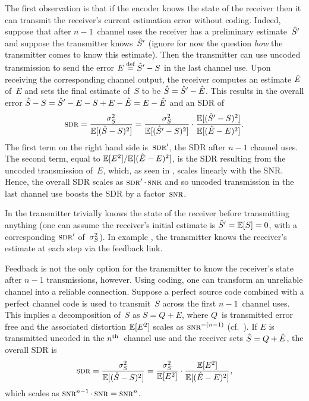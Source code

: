 The first observation is that if the encoder knows the state of the receiver
then it can transmit the receiver's current estimation error without coding. 
Indeed, suppose that after $n-1$~channel uses the receiver has a preliminary
estimate~${\hat{S}}'$ and suppose the transmitter knows~${\hat{S}}'$ (ignore for now the
question \emph{how} the transmitter comes to know this estimate). Then the
transmitter can use uncoded transmission to send the error $E \stackrel{\text{def}}{=} {\hat{S}}' - S$ in
the last channel use. Upon receiving the corresponding channel output, the
receiver computes an estimate $\hat{E}$ of~$E$ and sets the final estimate of~$S$ to
be ${\hat{S}} = {\hat{S}}' - \hat{E}$. This results in the overall error ${\hat{S}} - S = {\hat{S}}' - E - S
+ E - \hat{E} = E - \hat{E}$ and an SDR of
\begin{equation*}
  \sdr = \frac{\ssq}{\mse} = \frac{\ssq}{\E[(\Sh' - S)^2]} \cdot
  \frac{\E[(\Sh' - S)^2]}{\msee}.
\end{equation*}
The first term on the right hand side is~$\sdr'$, the SDR after $n-1$ channel
uses. The second term, equal to $\mathbb{E}[E^2]/{\mathbb{E}[(\hat{E} - E)^2]}$, is the SDR resulting from the
uncoded transmission of~$E$, which, as seen in , scales
linearly with the SNR. Hence, the overall SDR scales as $\sdr' \cdot \snr$ and
so uncoded transmission in the last channel use boosts the SDR by a
factor~$\snr$. 

In  the transmitter trivially knows the state of the receiver
before transmitting anything (one can assume the receiver's initial estimate is
${\hat{S}}' = \mathbb{E}[S] = 0$, with a corresponding $\sdr'$ of~${\sigma_S^2}$). In example
, the transmitter knows the receiver's estimate at each step
via the feedback link. 

Feedback is not the only option for the transmitter to know the receiver's state
after $n-1$ transmissions, however. Using coding, one can transform an
unreliable channel into a reliable connection. Suppose a perfect source code
combined with a perfect channel code is used to transmit~$S$ across the first
$n-1$~channel uses. This implies a decomposition of~$S$ as $S = Q + E$, where
$Q$~is transmitted error free and the associated distortion $\mathbb{E}[E^2]$ scales as
$\snr^{-(n-1)}$ (cf.~). If $E$ is transmitted
uncoded in the $n{^{\text{th}}}$~channel use and the receiver sets ${\hat{S}} = Q + \hat{E}$, the
overall SDR is \begin{equation*} \sdr = \frac{\ssq}{\mse} = \frac{\ssq}{\E[E^2]}
  \cdot \frac{\E[E^2]}{\E[(\Eh - E)^2]}, \end{equation*} which scales as
  $\snr^{n-1} \cdot \snr = \snr^n$. 

